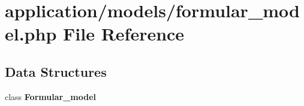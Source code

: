 \section{application/models/formular\-\_\-model.php File Reference}
\label{formular__model_8php}
\subsection*{Data Structures}
\begin{DoxyCompactItemize}
\item 
class {\bf Formular\-\_\-model}
\end{DoxyCompactItemize}
